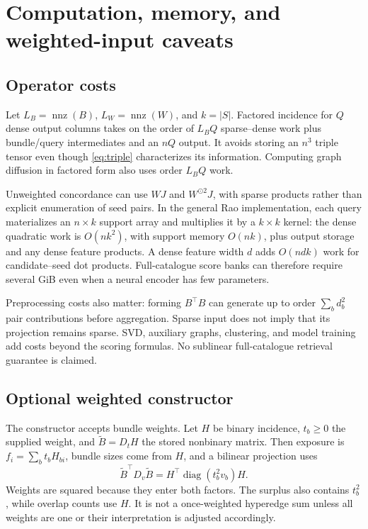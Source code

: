 \documentclass[11pt,a4paper]{article}
\theoremstyle{remark}
\newcommand{\diag}{\operatorname{diag}}
\begin{document}
\section{Computation, memory, and weighted-input caveats}
\subsection{Operator costs}
Let $L_B=\operatorname{nnz}(B)$, $L_W=\operatorname{nnz}(W)$, and
$k=|S|$. Factored incidence for $Q$ dense output columns takes on the
order of $L_BQ$ sparse--dense work plus bundle/query intermediates and
an $nQ$ output. It avoids storing an $n^3$ triple tensor even though
\eqref{eq:triple} characterizes its information. Computing graph diffusion
in factored form also uses order $L_BQ$ work.

Unweighted concordance can use $WJ$ and $W^{\odot2}J$, with sparse
products rather than explicit enumeration of seed pairs. In the general
Rao implementation, each query materializes an $n\times k$ support
array and multiplies it by a $k\times k$ kernel: the dense quadratic
work is $O(nk^2)$, with support memory $O(nk)$, plus output storage and
any dense feature products. A dense feature width $d$ adds $O(ndk)$
work for candidate--seed dot products. Full-catalogue score banks can
therefore require several GiB even when a neural encoder has few parameters.

Preprocessing costs also matter: forming $B^\top B$ can generate up to
order $\sum_b d_b^2$ pair contributions before aggregation. Sparse input
does not imply that its projection remains sparse. SVD, auxiliary graphs,
clustering, and model training add costs beyond the scoring formulas.
No sublinear full-catalogue retrieval guarantee is claimed.

\subsection{Optional weighted constructor}\label{sec:weighted}
The constructor accepts bundle weights. Let $H$ be binary incidence,
$t_b\geq0$ the supplied weight, and $\widetilde B=D_tH$ the stored
nonbinary matrix. Then exposure is $f_i=\sum_b t_bH_{bi}$, bundle sizes
come from $H$, and a bilinear projection uses
\begin{equation}
 \widetilde B^\top D_v\widetilde B
 =H^\top\diag(t_b^2v_b)H.
\end{equation}
Weights are squared because they enter both factors. The surplus also
contains $t_b^2$, while overlap counts use $H$. It is not a once-weighted
hyperedge sum unless all weights are one or their interpretation is
adjusted accordingly.
\end{document}
